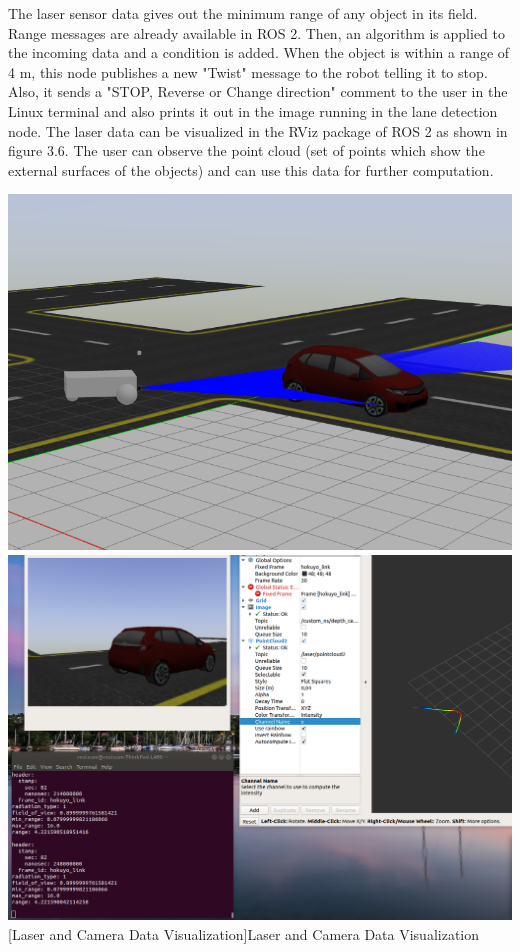 \documentclass[%
xelatex,
	oneside,		%
	12pt,			%
	parskip=half,	%
	abstracton,
	chapterprefix=true%
    appendixprefix=true]
{scrbook}
\begin{document}
The laser sensor data gives out the minimum range of any object in its field. Range messages are already available in ROS 2. Then, an algorithm is applied to the incoming data and a condition is added. When the object is within a range of 4 m, this node publishes a new "Twist" message to the robot telling it to stop. Also, it sends a "STOP, Reverse or Change direction" comment to the user in the Linux terminal and also prints it out in the image running in the lane detection node. The laser data can be visualized in the RViz package of ROS 2 as shown in figure 3.6. The user can observe the point cloud (set of points which show the external surfaces of the objects) and can use this data for further computation.
			\begin{center}
\includegraphics[scale=0.3]{fig/laser.png}
\includegraphics[scale=0.17]{fig/laser2.png}
[Laser and Camera Data Visualization]{Laser and Camera Data Visualization}
\label{fig:laser}
\end{center}
\end{document}

